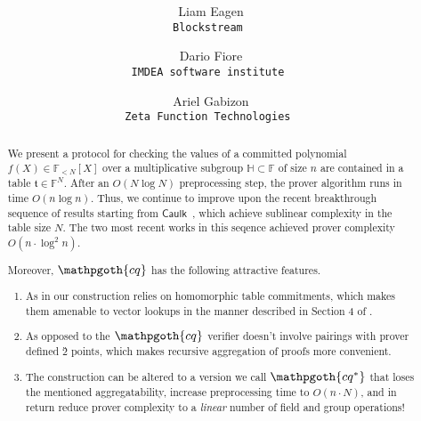 \documentclass[11pt]{article} %
\title{ \bf \papertitle \\[0.72cm]}
\author{ Liam Eagen \\ \tt{Blockstream} \and  Dario Fiore \\ \tt{IMDEA software institute}  \and Ariel Gabizon \\ \tt{Zeta Function Technologies} }
\newcommand{\cq}{\ensuremath{\mathpgoth{cq} }\xspace}
\newcommand{\cqstar}{\ensuremath{\mathpgoth{cq^{\mathbf{*}} }}\xspace}
\newcommand{\caulk}{\ensuremath{\mathsf{Caulk}}\xspace}
\newcommand{\F}{\ensuremath{\mathbb F}\xspace}
\newcommand{\polysofdeg}[1]{\ensuremath{\F_{< #1}[X]}\xspace}
\newcommand{\subspace}{\ensuremath{\mathbb{H}}\xspace}
\newcommand{\witsize}{\ensuremath{n}\xspace}
\newcommand{\tabsize}{\ensuremath{N}\xspace}
\newcommand{\tab}{\ensuremath{\mathfrak{t}}\xspace}
\begin{document}
    \maketitle
\begin{abstract}
 We present a protocol for checking the values of a committed polynomial $f(X)\in \polysofdeg{\tabsize}$ over a multiplicative subgroup $\subspace\subset \F$ of size \witsize are contained in a
 table $\tab\in \F^\tabsize$. After an $O(\tabsize \log \tabsize)$ preprocessing step, the prover algorithm runs in time $O(\witsize\log \witsize)$.
 Thus, we continue to improve upon the recent breakthrough sequence of results\cite{caulk,caulkp,flookup,baloo} starting from \caulk~\cite{caulk}, which achieve sublinear complexity in the table size \tabsize. The two most recent works in this seqence \cite{flookup,baloo} achieved
 prover complexity $O(\witsize\cdot \log^2 \witsize)$.
 
 Moreover, \cq has the following attractive features.
 \begin{enumerate}
  \item As in \cite{caulk,caulkp,baloo} our construction relies on homomorphic table commitments, which makes them amenable to vector lookups in the manner described in Section 4 of \cite{plookup}.
 \item As opposed to \cite{caulk,caulkp,flookup,baloo} the \cq verifier doesn't involve pairings with prover defined \G2 points, which makes recursive aggregation of proofs more convenient.
 
\item The construction can be altered to a version we call \cqstar that loses the mentioned aggregatability, increase preprocessing time to $O(\witsize\cdot \tabsize)$, and in return reduce prover complexity to a \emph{linear} number of field and group operations!
 \end{enumerate}
 \end{abstract}

\end{document}
